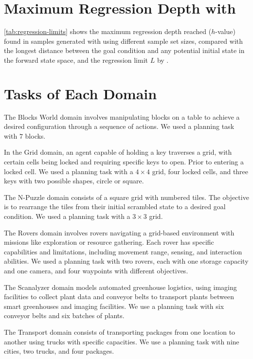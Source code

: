 \documentclass[ppgc,diss,english]{iiufrgs}
\begin{document}
\appendix

\chapter{Maximum Regression Depth with \bfsrs}
\label{cha:max_reg_depth}

\cref{tab:regression-limits} shows the maximum regression depth reached ($h$-value) found in samples generated with \bfsrs using different sample set sizes, compared with the longest distance \distfarthest between the goal condition and any potential initial state in the forward state space, and the regression limit $L$ by \citet{Bettker.etal/2022}.



\chapter{Tasks of Each Domain}
\label{cha:tasks_each_domain}
The Blocks World domain involves manipulating blocks on a table to achieve a desired configuration through a sequence of actions. We used a planning task with $7$ blocks.

In the Grid domain, an agent capable of holding a key traverses a grid, with certain cells being locked and requiring specific keys to open. Prior to entering a locked cell. We used a planning task with a $4 \times 4$ grid, four locked cells, and three keys with two possible shapes, circle or square.

The N-Puzzle domain consists of a square grid with numbered tiles. The objective is to rearrange the tiles from their initial scrambled state to a desired goal condition. We used a planning task with a $3 \times 3$ grid.

The Rovers domain involves rovers navigating a grid-based environment with missions like exploration or resource gathering. Each rover has specific capabilities and limitations, including movement range, sensing, and interaction abilities. We used a planning task with two rovers, each with one storage capacity and one camera, and four waypoints with different objectives.

The Scanalyzer domain models automated greenhouse logistics, using imaging facilities to collect plant data and conveyor belts to transport plants between smart greenhouses and imaging facilities. We use a planning task with six conveyor belts and six batches of plants.

The Transport domain consists of transporting packages from one location to another using trucks with specific capacities. We use a planning task with nine cities, two trucks, and four packages.
\end{document}
